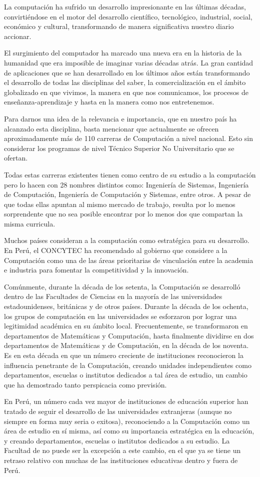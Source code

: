La computación ha sufrido un desarrollo impresionante en las últimas décadas, convirtiéndose en 
el motor del desarrollo cientí­fico, tecnológico, industrial, social, económico y cultural, 
transformando de manera significativa nuestro diario accionar.

El surgimiento del computador ha marcado una nueva era en la historia de la humanidad que era 
imposible de imaginar varias décadas atrás. La gran cantidad de aplicaciones que se han desarrollado 
en los últimos años están transformando el desarrollo de todas las disciplinas del saber, 
la comercialización en el ámbito globalizado en que vivimos, la manera en que nos comunicamos, 
los procesos de enseñanza-aprendizaje y hasta en la manera como nos entretenemos.

Para darnos una idea de la relevancia e importancia, que en nuestro paí­s ha alcanzado esta 
disciplina, basta mencionar que actualmente se ofrecen aproximadamente más de 110 carreras de Computación a nivel nacional. 
Esto sin considerar los programas de nivel Técnico Superior No Universitario que se ofertan.

Todas estas carreras existentes tienen como centro de su estudio a la computación pero lo 
hacen con 28 nombres distintos como: Ingenierí­a de Sistemas, Ingenierí­a de Computación, 
Ingenierí­a de Computación y Sistemas, entre otros. A pesar de que todas ellas apuntan al mismo 
mercado de trabajo, resulta por lo menos sorprendente que no sea posible encontrar por lo menos dos 
que compartan la misma curricula.

Muchos paí­ses consideran a la computación como estratégica para su desarrollo. En Perú, 
el \ac{CONCYTEC} ha recomendado al gobierno que considere a la Computación como una de las 
áreas prioritarias de vinculación entre la academia e industria para fomentar la 
competitividad y la innovación.

Comúnmente, durante la década de los setenta, la Computación se desarrolló dentro 
de las Facultades de Ciencias en la mayorí­a de las universidades estadounidenses, 
británicas y de otros paí­ses. Durante la década de los ochenta, los grupos de 
computación en las universidades se esforzaron por lograr una legitimidad académica 
en su ámbito local. Frecuentemente, se transformaron en departamentos de Matemáticas y 
Computación, hasta finalmente dividirse en dos departamentos de Matemáticas y de 
Computación, en la década de los noventa. Es en esta década en que un número 
creciente de instituciones reconocieron la influencia penetrante de la Computación, 
creando unidades independientes como departamentos, escuelas o institutos dedicados a 
tal área de estudio, un cambio que ha demostrado tanto perspicacia como previsión. 

En Perú, un número cada vez mayor de instituciones de educación superior han 
tratado de seguir el desarrollo de las universidades extranjeras (aunque no siempre en 
forma muy seria o exitosa), reconociendo a la Computación como un área de estudio 
en sí­ misma, así­ como su importancia estratégica en la educación, y creando 
departamentos, escuelas o institutos dedicados a su estudio. La Facultad de \FacultadName 
no puede ser la excepción a este cambio, en el que ya se tiene un retraso relativo con 
muchas de las instituciones educativas dentro y fuera de Perú.
